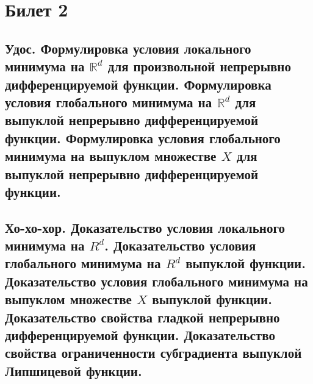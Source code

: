 \section{Билет 2}

\subsection{Удос. Формулировка условия локального минимума на \texorpdfstring{$\mathbb{R}^d$}{R} для произвольной
    непрерывно дифференцируемой функции. Формулировка условия глобального минимума на
    \texorpdfstring{$\mathbb{R}^d$}{R} для выпуклой непрерывно дифференцируемой
    функции. Формулировка условия глобального минимума на выпуклом
    множестве \texorpdfstring{$X$}{X} для выпуклой непрерывно дифференцируемой функции.}

\subsection{Хо-хо-хор. Доказательство условия локального минимума на \texorpdfstring{$R^d$}{R}.
    Доказательство условия глобального минимума на \texorpdfstring{$R^d$}{R} выпуклой функции.
    Доказательство условия глобального минимума на выпуклом множестве \texorpdfstring{$X$}{X} выпуклой функции.
    Доказательство свойства гладкой непрерывно дифференцируемой функции.
    Доказательство свойства ограниченности субградиента выпуклой Липшицевой функции.}


